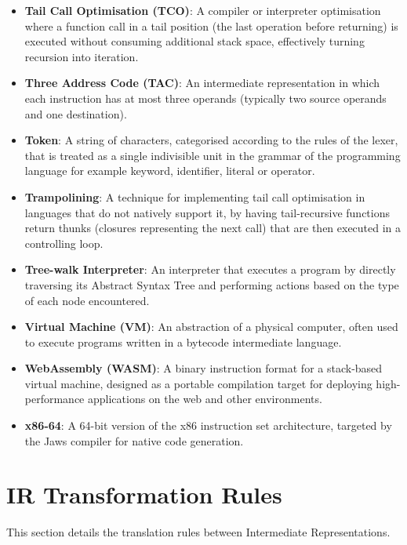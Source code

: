 \documentclass[final]{cmpreport_02}
\begin{document}
\begin{itemize}
    \item \textbf{Tail Call Optimisation (TCO)}: A compiler or interpreter optimisation where a function call in a tail position (the last operation before returning) is executed without consuming additional stack space, effectively turning recursion into iteration.
    \item \textbf{Three Address Code (TAC)}: An intermediate representation in which each instruction has at most three operands (typically two source operands and one destination).
    \item \textbf{Token}: A string of characters, categorised according to the rules of the lexer, that is treated as a single indivisible unit in the grammar of the programming language for example keyword, identifier, literal or operator.
    \item \textbf{Trampolining}: A technique for implementing tail call optimisation in languages that do not natively support it, by having tail-recursive functions return thunks (closures representing the next call) that are then executed in a controlling loop.
    \item \textbf{Tree-walk Interpreter}: An interpreter that executes a program by directly traversing its Abstract Syntax Tree and performing actions based on the type of each node encountered.
    \item \textbf{Virtual Machine (VM)}: An abstraction of a physical computer, often used to execute programs written in a bytecode intermediate language.
    \item \textbf{WebAssembly (WASM)}: A binary instruction format for a stack-based virtual machine, designed as a portable compilation target for deploying high-performance applications on the web and other environments.
    \item \textbf{x86-64}: A 64-bit version of the x86 instruction set architecture, targeted by the Jaws compiler for native code generation.
\end{itemize}

\appendix %


\section{IR Transformation Rules}

This section details the translation rules between Intermediate Representations.
\end{document}
